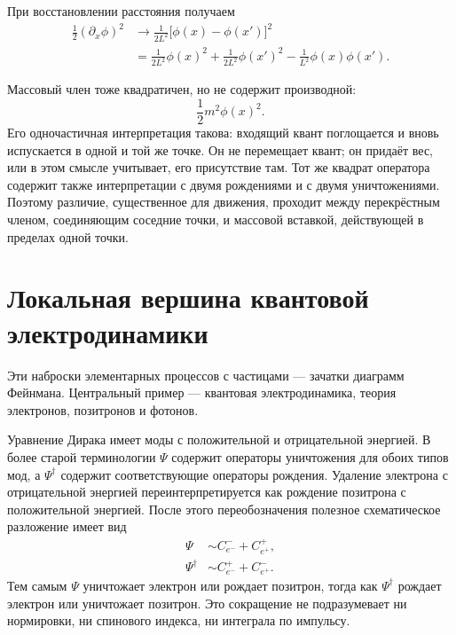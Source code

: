 При восстановлении расстояния получаем
\begin{align}
\frac12(\partial_x\phi)^2
&\longrightarrow
\frac{1}{2L^2}\bigl[\phi(x)-\phi(x')\bigr]^2
\\
&=
\frac{1}{2L^2}\phi(x)^2
+\frac{1}{2L^2}\phi(x')^2
-\frac{1}{L^2}\phi(x)\phi(x').
\end{align}

Массовый член тоже квадратичен, но не содержит производной:
\begin{equation}
\frac12m^2\phi(x)^2.
\end{equation}
Его одночастичная интерпретация такова: входящий квант поглощается и вновь испускается в одной и той же точке. Он не перемещает квант; он придаёт вес, или в этом смысле учитывает, его присутствие там. Тот же квадрат оператора содержит также интерпретации с двумя рождениями и с двумя уничтожениями. Поэтому различие, существенное для движения, проходит между перекрёстным членом, соединяющим соседние точки, и массовой вставкой, действующей в пределах одной точки.

\section{Локальная вершина квантовой электродинамики}

Эти наброски элементарных процессов с частицами — зачатки диаграмм Фейнмана. Центральный пример — квантовая электродинамика, теория электронов, позитронов и фотонов.

Уравнение Дирака имеет моды с положительной и отрицательной энергией. В более старой терминологии \(\Psi\) содержит операторы уничтожения для обоих типов мод, а \(\Psi^\dagger\) содержит соответствующие операторы рождения. Удаление электрона с отрицательной энергией переинтерпретируется как рождение позитрона с положительной энергией. После этого переобозначения полезное схематическое разложение имеет вид
\begin{align}
\Psi
&\sim
C^-_{e^-}+C^+_{e^+},
\\
\Psi^\dagger
&\sim
C^+_{e^-}+C^-_{e^+}.
\end{align}
Тем самым \(\Psi\) уничтожает электрон или рождает позитрон, тогда как \(\Psi^\dagger\) рождает электрон или уничтожает позитрон. Это сокращение не подразумевает ни нормировки, ни спинового индекса, ни интеграла по импульсу.

